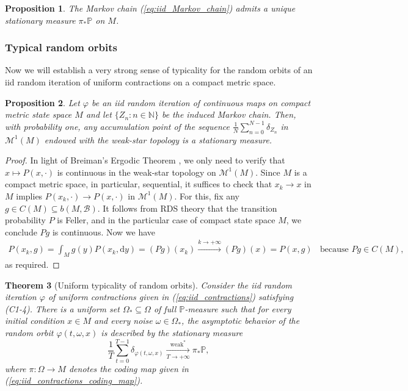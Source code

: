 \documentclass[a4paper]{article}
\theoremstyle{plain}
\newtheorem{theorem}{Theorem}[section] %
\newtheorem{prop} [theorem]{Proposition}
\theoremstyle{definition}
\newcommand{\PP}{\mathbb{P}}
\newcommand{\N}{\mathbb{N}}
\newcommand{\Bil}{\mathcal{B}}
\newcommand{\Mil}{\mathcal{M}}
\begin{document}
\begin{prop} \label{prop:unique_stat_meas_iid_contractions}
	The Markov chain (\ref{eq:iid_Markov_chain}) admits a unique stationary measure $\pi_*\PP$ on $M$.
\end{prop}

\subsubsection{Typical random orbits}
Now we will establish a very strong sense of typicality for the random orbits of an iid random iteration of uniform contractions on a compact metric space.

\begin{prop}\label{prop:Breiman}
	Let $\varphi$ be an iid random iteration of continuous maps on compact metric state space $M$ and let $\{Z_n:n\in\N\}$ be the induced Markov chain. Then, with probability one, any accumulation point of the sequence $\frac{1}{N}\sum_{n=0}^{N-1} \delta_{Z_n}$ in $\Mil^1(M)$ endowed with the weak-star topology is a stationary measure.
\end{prop}

\begin{proof}
	In light of Breiman's Ergodic Theorem \cite{Breiman1960}, we only need to verify that $x\mapsto P(x,\cdot)$ is continuous in the weak-star topology on $\Mil^1(M)$. Since $M$ is a compact metric space, in particular, sequential, it suffices to check that $x_k\to x$ in $M$ implies $P(x_k,\cdot)\to P(x,\cdot)$ in $\Mil^1(M)$. For this, fix any $g\in C(M)\subseteq b(M,\Bil)$. It follows from RDS theory \cite[Theorem 2.1.4]{Arnold1998} that the transition probability $P$ is Feller, and in the particular case of compact state space $M$, we conclude $Pg$ is continuous. Now we have
	\begin{align*}
		P(x_k,g) = \int_M g(y) P(x_k,\mathrm{d}y) = (Pg)(x_k)\xrightarrow{k\to+\infty} (Pg)(x)=P(x,g)~~~~\text{because $Pg\in C(M)$},
	\end{align*}
	as required.
\end{proof}




\begin{theorem}[Uniform typicality of random orbits]\label{thm:typicality_randomcontractions}
	Consider the iid random iteration $\varphi$ of uniform contractions given in (\ref{eq:iid_contractions}) satisfying (C1-4).	There is a uniform set $\Omega_*\subseteq \Omega$ of full $\PP$-measure such that for every initial condition $x\in M$ and every noise $\omega\in\Omega_*$, the asymptotic behavior of the random orbit $\varphi(t,\omega,x)$ is described by the stationary measure
	$$\frac{1}{T} \sum_{t=0}^{T-1} \delta_{\varphi(t,\omega,x)}\xrightarrow[T\to+\infty]{\text{weak}^*} \pi_{*}\PP,$$
	where $\pi:\Omega\to M$ denotes the coding map given in (\ref{eq:iid_contractions_coding_map}).
\end{theorem}
\end{document}

